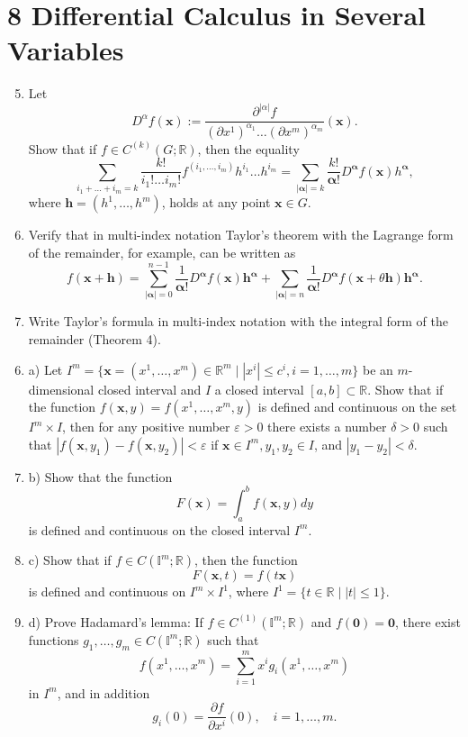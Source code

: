 \section*{8 Differential Calculus in Several Variables}
\begin{enumerate}
    \setcounter{enumi}{4}
    \renewcommand{\theenumi}{\alph{enumi}}
    \item Let
    \[
    D^\alpha f(\mathbf{x}) := \frac{\partial^{|\alpha|} f}{(\partial x^1)^{\alpha_1} \ldots (\partial x^m)^{\alpha_m}}(\mathbf{x}).
    \]
    Show that if $f \in C^{(k)}(G; \mathbb{R})$, then the equality
    \[
    \sum_{i_1 + \ldots + i_m = k} \frac{k!}{i_1! \ldots i_m!} f^{(i_1, \ldots, i_m)} h^{i_1} \ldots h^{i_m} = \sum_{|\mathbf{\alpha}|=k} \frac{k!}{\mathbf{\alpha}!} D^\mathbf{\alpha} f(\mathbf{x}) h^\mathbf{\alpha},
    \]
    where $\mathbf{h} = (h^1, \ldots, h^m)$, holds at any point $\mathbf{x} \in G$.
    \item Verify that in multi-index notation Taylor's theorem with the Lagrange form
    of the remainder, for example, can be written as
    \[
    f(\mathbf{x} + \mathbf{h}) = \sum_{|\mathbf{\alpha}|=0}^{n-1} \frac{1}{\mathbf{\alpha}!} D^\mathbf{\alpha} f(\mathbf{x}) \mathbf{h}^\mathbf{\alpha} + \sum_{|\mathbf{\alpha}|=n} \frac{1}{\mathbf{\alpha}!} D^\mathbf{\alpha} f(\mathbf{x} + \theta \mathbf{h}) \mathbf{h}^\mathbf{\alpha}.
    \]
    \item Write Taylor's formula in multi-index notation with the integral form of the
    remainder (Theorem 4).
\end{enumerate}
\begin{enumerate}
    \setcounter{enumi}{5}
    \item a) Let $I^m = \{\mathbf{x} = (x^1, \ldots, x^m) \in \mathbb{R}^m \mid |x^i| \leq c^i, i = 1, \ldots, m\}$ be an $m$-dimensional closed interval and $I$ a closed interval $[a, b] \subset \mathbb{R}$. Show that if the function
    $f(\mathbf{x}, y) = f(x^1, \ldots, x^m, y)$ is defined and continuous on the set $I^m \times I$, then for any
    positive number $\varepsilon > 0$ there exists a number $\delta > 0$ such that $|f(\mathbf{x}, y_1) - f(\mathbf{x}, y_2)| <
    \varepsilon$ if $\mathbf{x} \in I^m, y_1, y_2 \in I$, and $|y_1 - y_2| < \delta$.
    \item b) Show that the function
    \[
    F(\mathbf{x}) = \int_{a}^{b} f(\mathbf{x}, y) dy
    \]
    is defined and continuous on the closed interval $I^m$.
    \item c) Show that if $f \in C(\mathbb{I}^m; \mathbb{R})$, then the function
    \[
    F(\mathbf{x}, t) = f(t\mathbf{x})
    \]
    is defined and continuous on $I^m \times I^1$, where $I^1 = \{t \in \mathbb{R} \mid |t| \leq 1\}$.
    \item d) Prove Hadamard's lemma:
    If $f \in C^{(1)}(\mathbb{I}^m; \mathbb{R})$ and $f(\mathbf{0}) = \mathbf{0}$, there exist functions $g_1, \ldots, g_m \in C(\mathbb{I}^m; \mathbb{R})$
    such that
    \[
    f(x^1, \ldots, x^m) = \sum_{i=1}^m x^i g_i(x^1, \ldots, x^m)
    \]
    in $I^m$, and in addition
    \[
    g_i(0) = \frac{\partial f}{\partial x^i}(0), \quad i = 1, \ldots, m.
    \]
\end{enumerate}